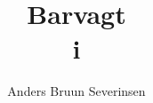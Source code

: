 

\title{Barvagt\\ i \fredagscafeen}
\author{Anders Bruun Severinsen}


\maketitle

\tableofcontents











\printindex


